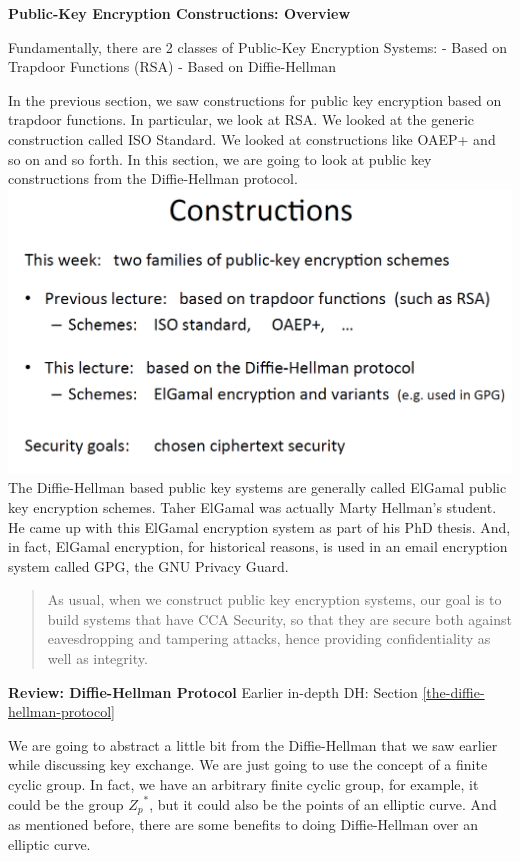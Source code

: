 \documentclass[11pt]{article}
\makeatletter
\def\maxwidth{\ifdim\Gin@nat@width>\linewidth\linewidth
    \else\Gin@nat@width\fi}
\let\Oldincludegraphics\includegraphics
\renewcommand{\includegraphics}[1]{\Oldincludegraphics[width=.8\maxwidth]{#1}}
\makeatother
\begin{document}
\textbf{Public-Key Encryption Constructions: Overview}

Fundamentally, there are 2 classes of Public-Key Encryption Systems: -
Based on Trapdoor Functions (RSA) - Based on Diffie-Hellman

In the previous section, we saw constructions for public key encryption
based on trapdoor functions. In particular, we look at RSA. We looked at
the generic construction called ISO Standard. We looked at constructions
like OAEP+ and so on and so forth. In this section, we are going to look
at public key constructions from the Diffie-Hellman protocol.
\includegraphics{./Images/PKEncConstructs-Overview.png} The
Diffie-Hellman based public key systems are generally called ElGamal
public key encryption schemes. Taher ElGamal was actually Marty
Hellman's student. He came up with this ElGamal encryption system as
part of his PhD thesis. And, in fact, ElGamal encryption, for historical
reasons, is used in an email encryption system called GPG, the GNU
Privacy Guard.

\begin{quote}
As usual, when we construct public key encryption systems, our goal is
to build systems that have CCA Security, so that they are secure both
against eavesdropping and tampering attacks, hence providing
confidentiality as well as integrity.
\end{quote}

\textbf{Review: Diffie-Hellman Protocol} Earlier in-depth DH:
Section \ref{the-diffie-hellman-protocol}

We are going to abstract a little bit from the Diffie-Hellman that we
saw earlier while discussing key exchange. We are just going to use the
concept of a finite cyclic group. In fact, we have an arbitrary finite
cyclic group, for example, it could be the group \({Z_{p}}^{*}\), but it
could also be the points of an elliptic curve. And as mentioned before,
there are some benefits to doing Diffie-Hellman over an elliptic curve.
\end{document}
